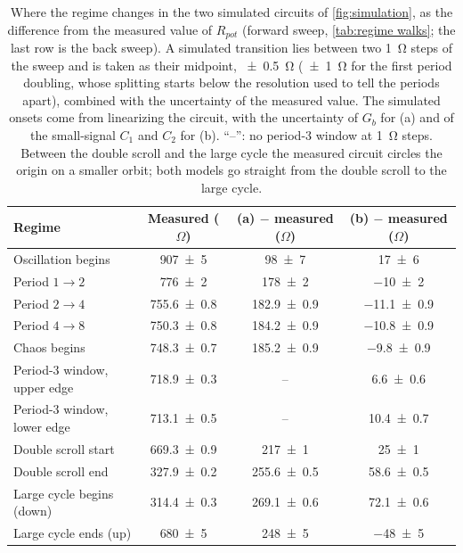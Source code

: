 \begin{table}[htb]
    \centering
    \begin{tabular}{lccc}
         \toprule
         Regime & Measured (\(\Omega\)) & (a) \(-\) measured (\(\Omega\)) & (b) \(-\) measured (\(\Omega\))\\
         \midrule
         Oscillation begins & \num{907\pm5} & \num{+98\pm7} & \num{+17\pm6}\\
         Period \(1\to 2\) & \num{776\pm2} & \num{+178\pm2} & \num{-10\pm2}\\
         Period \(2\to 4\) & \num{755.6\pm0.8} & \num{+182.9\pm0.9} & \num{-11.1\pm0.9}\\
         Period \(4\to 8\) & \num{750.3\pm0.8} & \num{+184.2\pm0.9} & \num{-10.8\pm0.9}\\
         Chaos begins & \num{748.3\pm0.7} & \num{+185.2\pm0.9} & \num{-9.8\pm0.9}\\
         Period-3 window, upper edge & \num{718.9\pm0.3} & -- & \num{+6.6\pm0.6}\\
         Period-3 window, lower edge & \num{713.1\pm0.5} & -- & \num{+10.4\pm0.7}\\
         Double scroll start & \num{669.3\pm0.9} & \num{+217\pm1} & \num{+25\pm1}\\
         Double scroll end & \num{327.9\pm0.2} & \num{+255.6\pm0.5} & \num{+58.6\pm0.5}\\
         Large cycle begins (down) & \num{314.4\pm0.3} & \num{+269.1\pm0.6} & \num{+72.1\pm0.6}\\
         Large cycle ends (up) & \num{680\pm5} & \num{+248\pm5} & \num{-48\pm5}\\
         \bottomrule
    \end{tabular}
    \caption{Where the regime changes in the two simulated circuits of \cref{fig:simulation}, as the difference from the measured value of \(R_{pot}\) (forward sweep, \cref{tab:regime walks}; the last row is the back sweep). A simulated transition lies between two \qty{1}{\ohm} steps of the sweep and is taken as their midpoint, \qty{\pm0.5}{\ohm} (\qty{\pm1}{\ohm} for the first period doubling, whose splitting starts below the resolution used to tell the periods apart), combined with the uncertainty of the measured value. The simulated onsets come from linearizing the circuit, with the uncertainty of \(G_b\) for (a) and of the small-signal \(C_1\) and \(C_2\) for (b). ``--'': no period-3 window at \qty{1}{\ohm} steps. Between the double scroll and the large cycle the measured circuit circles the origin on a smaller orbit; both models go straight from the double scroll to the large cycle.}
    \label{tab:simulation}
\end{table}

